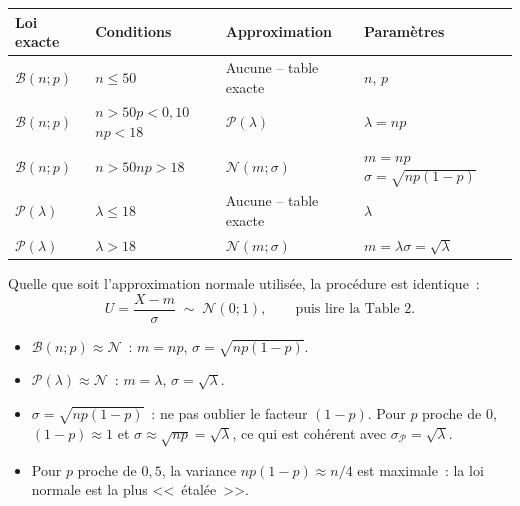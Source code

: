 \documentclass[11pt,a4paper]{article}
\begin{document}
\begin{methbox}
\begin{center}
\begin{tabular}{p{3.5cm}p{3.5cm}p{3.5cm}p{3cm}}
\toprule
\textbf{Loi exacte} & \textbf{Conditions} & \textbf{Approximation} & \textbf{Param\`etres} \\
\midrule
$\mathcal{B}(n;p)$ &
  $n \leq 50$ & Aucune -- table exacte & $n$, $p$ \\
\addlinespace
$\mathcal{B}(n;p)$ &
  $n>50$\newline $p<0{,}10$\newline $np<18$ &
  $\mathcal{P}(\lambda)$ &
  $\lambda = np$ \\
\addlinespace
$\mathcal{B}(n;p)$ &
  $n>50$\newline $np>18$ &
  $\mathcal{N}(m;\sigma)$ &
  $m=np$\newline $\sigma=\sqrt{np(1-p)}$ \\
\addlinespace
$\mathcal{P}(\lambda)$ &
  $\lambda \leq 18$ & Aucune -- table exacte & $\lambda$ \\
\addlinespace
$\mathcal{P}(\lambda)$ &
  $\lambda > 18$ &
  $\mathcal{N}(m;\sigma)$ &
  $m=\lambda$\newline $\sigma=\sqrt{\lambda}$ \\
\bottomrule
\end{tabular}
\end{center}
\end{methbox}

\begin{methbox}
Quelle que soit l'approximation normale utilis\'ee, la proc\'edure est identique~:
$$U = \frac{X - m}{\sigma} \;\sim\; \mathcal{N}(0;1), \qquad\text{puis lire la Table~2.}$$
\begin{itemize}
  \item $\mathcal{B}(n;p) \approx \mathcal{N}$~: $m = np$, $\sigma = \sqrt{np(1-p)}$.
  \item $\mathcal{P}(\lambda) \approx \mathcal{N}$~: $m = \lambda$, $\sigma = \sqrt{\lambda}$.
\end{itemize}
\end{methbox}

\begin{methbox}
\begin{itemize}
  \item $\sigma = \sqrt{np(1-p)}$~: ne pas oublier le facteur $(1-p)$. Pour $p$ proche de 0, $(1-p)\approx 1$ et $\sigma \approx \sqrt{np} = \sqrt{\lambda}$, ce qui est coh\'erent avec $\sigma_{\mathcal{P}} = \sqrt{\lambda}$.
  \item Pour $p$ proche de $0{,}5$, la variance $np(1-p) \approx n/4$ est maximale~: la loi normale est la plus <<~{}\'etalée~>>.
\end{itemize}
\end{methbox}
\end{document}
